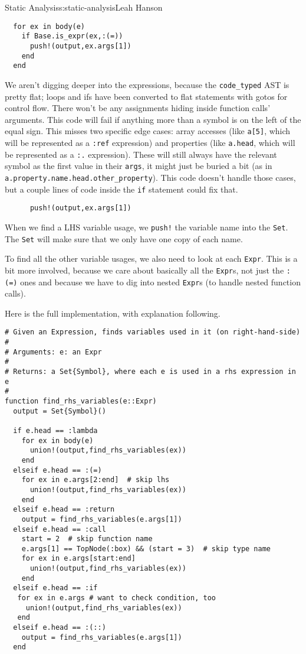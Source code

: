 \begin{aosachapter}{Static Analysis}{s:static-analysis}{Leah Hanson}
\begin{verbatim}
  for ex in body(e)
    if Base.is_expr(ex,:(=))
      push!(output,ex.args[1])
    end
  end
\end{verbatim}

We aren't digging deeper into the expressions, because the
\texttt{code\_typed} AST is pretty flat; loops and ifs have been
converted to flat statements with gotos for control flow. There won't be
any assignments hiding inside function calls' arguments. This code will
fail if anything more than a symbol is on the left of the equal sign.
This misses two specific edge cases: array accesses (like
\texttt{a{[}5{]}}, which will be represented as a \texttt{:ref}
expression) and properties (like \texttt{a.head}, which will be
represented as a \texttt{:.} expression). These will still always have
the relevant symbol as the first value in their \texttt{args}, it might
just be buried a bit (as in
\texttt{a.property.name.head.other\_property}). This code doesn't handle
those cases, but a couple lines of code inside the \texttt{if} statement
could fix that.

\begin{verbatim}
      push!(output,ex.args[1])
\end{verbatim}

When we find a LHS variable usage, we \texttt{push!} the variable name
into the \texttt{Set}. The \texttt{Set} will make sure that we only have
one copy of each name.

\label{finding-rhs-usages}

To find all the other variable usages, we also need to look at each
\texttt{Expr}. This is a bit more involved, because we care about
basically all the \texttt{Expr}s, not just the \texttt{:(=)} ones and
because we have to dig into nested \texttt{Expr}s (to handle nested
function calls).

Here is the full implementation, with explanation following.

\begin{verbatim}
# Given an Expression, finds variables used in it (on right-hand-side)
#
# Arguments: e: an Expr
#
# Returns: a Set{Symbol}, where each e is used in a rhs expression in e
#
function find_rhs_variables(e::Expr)
  output = Set{Symbol}()

  if e.head == :lambda
    for ex in body(e)
      union!(output,find_rhs_variables(ex))
    end
  elseif e.head == :(=)
    for ex in e.args[2:end]  # skip lhs
      union!(output,find_rhs_variables(ex))
    end
  elseif e.head == :return
    output = find_rhs_variables(e.args[1])
  elseif e.head == :call
    start = 2  # skip function name
    e.args[1] == TopNode(:box) && (start = 3)  # skip type name
    for ex in e.args[start:end]
      union!(output,find_rhs_variables(ex))
    end
  elseif e.head == :if
   for ex in e.args # want to check condition, too
     union!(output,find_rhs_variables(ex))
   end
  elseif e.head == :(::)
    output = find_rhs_variables(e.args[1])
  end


\end{verbatim}
\end{aosachapter}
